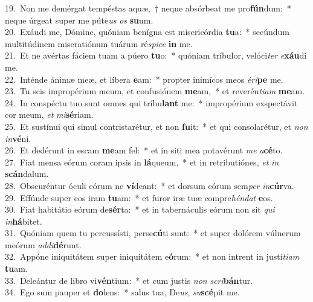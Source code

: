 {19.~}Non me demérgat tempéstas aquæ,~† neque absórbeat me pro\textbf{fún}dum:~* neque úrgeat super me púte\textit{us} \textit{os} \textbf{su}um.\\
{20.~}Exáudi me, Dómine, quóniam benígna est misericórdia \textbf{tu}a:~* secúndum multitúdinem miseratiónum tuárum ré\textit{spi}\textit{ce} \textbf{in} me.\\
{21.~}Et ne avértas fáciem tuam a púero \textbf{tu}o:~* quóniam tríbulor, velóci\textit{ter} \textit{e}\textbf{xáu}di me.\\
{22.~}Inténde ánimæ meæ, et líbera \textbf{e}am:~* propter inimícos meos \textit{é}\textit{ri}\textbf{pe} me.\\
{23.~}Tu scis impropérium meum, et confusiónem \textbf{me}am,~* et reverén\textit{ti}\textit{am} \textbf{me}am.\\
{24.~}In conspéctu tuo sunt omnes qui tríbu\textbf{lant} me:~* impropérium exspectávit cor meum, \textit{et} \textit{mi}\textbf{sé}riam.\\
{25.~}Et sustínui qui simul contristarétur, et non \textbf{fu}it:~* et qui consolarétur, et \textit{non} \textit{in}\textbf{vé}ni.\\
{26.~}Et dedérunt in escam \textbf{me}am fel:~* et in siti mea potavérunt \textit{me} \textit{a}\textbf{cé}to.\\
{27.~}Fiat mensa eórum coram ipsis in \textbf{lá}queum,~* et in retributiónes, \textit{et} \textit{in} \textbf{scán}dalum.\\
{28.~}Obscuréntur óculi eórum ne \textbf{ví}deant:~* et dorsum eórum sem\textit{per} \textit{in}\textbf{cúr}va.\\
{29.~}Effúnde super eos iram \textbf{tu}am:~* et furor iræ tuæ compre\textit{hén}\textit{dat} \textbf{e}os.\\
{30.~}Fiat habitátio eórum de\textbf{sér}ta:~* et in tabernáculis eórum non sit \textit{qui} \textit{in}\textbf{há}bitet.\\
{31.~}Quóniam quem tu percussísti, perse\textbf{cú}ti sunt:~* et super dolórem vúlnerum meórum \textit{ad}\textit{di}\textbf{dé}runt.\\
{32.~}Appóne iniquitátem super iniquitátem e\textbf{ó}rum:~* et non intrent in justí\textit{ti}\textit{am} \textbf{tu}am.\\
{33.~}Deleántur de libro vi\textbf{vén}tium:~* et cum justis \textit{non} \textit{scri}\textbf{bán}tur.\\
{34.~}Ego sum pauper et \textbf{do}lens:~* salus tua, De\textit{us}, \textit{su}\textbf{scé}pit me.\\
